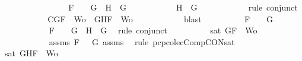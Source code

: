 \begin{isabellebody}
\ \ \ \ \ \ \isamarkupfalse%
\isanewline
\ \ \ \ \ \ \ \ \isamarkupfalse%
\ {\isachardoublequoteopen}F\ {\isacharequal}\ \isactrlbold {\isasymnot}\ {\isacharparenleft}\isactrlbold {\isasymnot}\ G{\isacharparenright}\ {\isasymand}\ H\ {\isacharequal}\ G{\isachardoublequoteclose}\isanewline
\ \ \ \ \ \ \ \ \isamarkupfalse%
\ \isamarkupfalse%
\ {\isachardoublequoteopen}H\ {\isacharequal}\ G{\isachardoublequoteclose}\isanewline
\ \ \ \ \ \ \ \ \ \ \isamarkupfalse%
\ {\isacharparenleft}rule\ conjunct{}{\isacharparenright}\isanewline
\ \ \ \ \ \ \ \ \isamarkupfalse%
\ \isamarkupfalse%
\ C{}{\isacharcolon}{\isachardoublequoteopen}{\isacharbraceleft}G{\isacharcomma}F{\isacharbraceright}\ {\isasymunion}\ Wo\ {\isacharequal}\ {\isacharbraceleft}G{\isacharcomma}H{\isacharcomma}F{\isacharbraceright}\ {\isasymunion}\ Wo{\isachardoublequoteclose}\isanewline
\ \ \ \ \ \ \ \ \ \ \isamarkupfalse%
\ blast\isanewline
\ \ \ \ \ \ \ \ \isamarkupfalse%
\ {\isachardoublequoteopen}F\ {\isacharequal}\ \isactrlbold {\isasymnot}\ {\isacharparenleft}\isactrlbold {\isasymnot}\ G{\isacharparenright}{\isachardoublequoteclose}\isanewline
\ \ \ \ \ \ \ \ \ \ \isamarkupfalse%
\ {\isacartoucheopen}F\ {\isacharequal}\ \isactrlbold {\isasymnot}\ {\isacharparenleft}\isactrlbold {\isasymnot}\ G{\isacharparenright}\ {\isasymand}\ H\ {\isacharequal}\ G{\isacartoucheclose}\ \isamarkupfalse%
\ {\isacharparenleft}rule\ conjunct{}{\isacharparenright}\isanewline
\ \ \ \ \ \ \ \ \isamarkupfalse%
\ {\isachardoublequoteopen}sat\ {\isacharparenleft}{\isacharbraceleft}G{\isacharcomma}F{\isacharbraceright}\ {\isasymunion}\ Wo{\isacharparenright}{\isachardoublequoteclose}\isanewline
\ \ \ \ \ \ \ \ \ \ \isamarkupfalse%
\ assms{\isacharparenleft}{}{\isacharparenright}\ {\isacartoucheopen}F\ {\isacharequal}\ \isactrlbold {\isasymnot}{\isacharparenleft}\isactrlbold {\isasymnot}\ G{\isacharparenright}{\isacartoucheclose}\ assms{\isacharparenleft}{}{\isacharcomma}{}{\isacharcomma}{}{\isacharparenright}\ \isamarkupfalse%
\ {\isacharparenleft}rule\ pcp{\isacharunderscore}colecComp{\isacharunderscore}CON{\isacharunderscore}sat{}{\isacharparenright}\isanewline
\ \ \ \ \ \ \ \ \isamarkupfalse%
\ {\isachardoublequoteopen}sat\ {\isacharparenleft}{\isacharbraceleft}G{\isacharcomma}H{\isacharcomma}F{\isacharbraceright}\ {\isasymunion}\ Wo{\isacharparenright}{\isachardoublequoteclose}\isanewline

\end{isabellebody}
